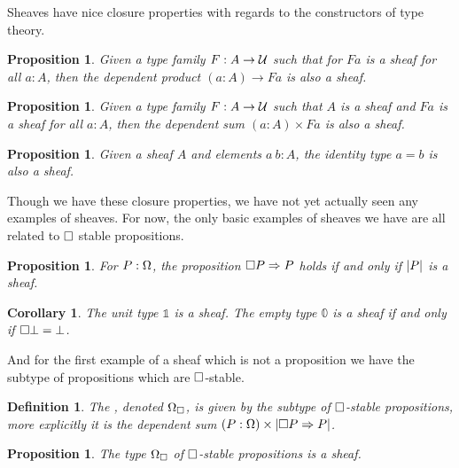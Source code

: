 \documentclass[11pt]{article}
\newtheorem{prop}[thrm]{Proposition}
\newtheorem{defn}[thrm]{Definition}
\newtheorem{coro}[thrm]{Corollary}
\begin{document}
Sheaves have nice closure properties with regards to the constructors of type
theory.

\begin{prop}\label{prop:pi-preserve-sheaf}
  Given a type family \(F : A \to \mathcal{U}\) such that for \(Fa\) is a sheaf for
  all \(a : A\), then the dependent product \((a : A) \to Fa\) is also a
  sheaf.
\end{prop}

\begin{prop}\label{prop:sigma-preserve-sheaf}
  Given a type family \(F : A \to \mathcal{U}\) such that \(A\) is a sheaf and \(Fa\)
  is a sheaf for all \(a : A\), then the dependent sum \((a : A) \times Fa\)
  is also a sheaf.
\end{prop}

\begin{prop}
  Given a sheaf \(A\) and elements \(a\ b : A\), the identity type \(a = b\) is
  also a sheaf.
\end{prop}

Though we have these closure properties, we have not yet actually seen
any examples of sheaves.
%
For now, the only basic examples of sheaves we have are all related to
\(\Box\) stable propositions.

\begin{prop}\label{prop:t-stable-iff-sheaf}
  For \(P : \Omega\), the proposition \({\Box{P}}\Rightarrow{P}\) holds if and
  only if \(|{P}|\) is a sheaf.
\end{prop}

\begin{coro}
  The unit type \(\mathbb{1}\) is a sheaf. The empty type
  \(\mathbb{0}\) is a sheaf if and only if \(\Box{\bot} = \bot\).
\end{coro}

And for the first example of a sheaf which is not a proposition we
have the subtype of propositions which are \(\Box\)-stable.

\begin{defn}
  The , denoted \(\Omega_\Box\), is
  given by the subtype of \(\Box\)-stable propositions, more explicitly it
  is the dependent sum \((P : \Omega) \times |{{\Box{P}}\Rightarrow{P}}|\).
\end{defn}

\begin{prop}
  The type \(\Omega_\Box\) of \(\Box\)-stable propositions is a sheaf.
\end{prop}
\end{document}
